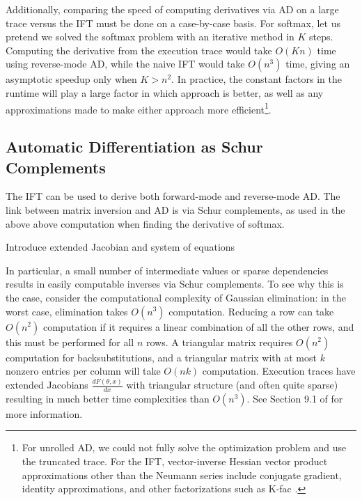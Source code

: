 \documentclass[11pt]{article}
\begin{document}
Additionally, comparing the speed of computing derivatives via AD on a large trace versus the IFT
must be done on a case-by-case basis.
For softmax, let us pretend we solved the softmax problem with an iterative method in $K$ steps.
Computing the derivative from the execution trace would take $O(Kn)$ time using reverse-mode AD,
while the naive IFT would take $O(n^3)$ time, giving an asymptotic speedup only when $K > n^2$.
In practice, the constant factors in the runtime will play a large factor in which approach
is better, as well as any approximations made to make either approach more efficient\footnote{
For unrolled AD, we could not fully solve the optimization problem and use the truncated trace.
For the IFT, vector-inverse Hessian vector product approximations other than the Neumann series
include conjugate gradient, identity approximations, and other factorizations such as K-fac
\citep{kfac}.
}.

\subsection{Automatic Differentiation as Schur Complements}
The IFT can be used to derive both forward-mode and reverse-mode AD.
The link between matrix inversion and AD is via Schur complements,
as used in the above above computation when finding the derivative of softmax.

{\color{red} Introduce extended Jacobian and system of equations}

In particular, a small number of intermediate values or sparse dependencies
results in easily computable inverses via Schur complements.
To see why this is the case, consider the computational complexity of Gaussian elimination:
in the worst case, elimination takes $O(n^3)$ computation.
Reducing a row can take $O(n^2)$ computation if it requires a linear combination of all the
other rows, and this must be performed for all $n$ rows.
A triangular matrix requires $O(n^2)$ computation for backsubstitutions,
and a triangular matrix with at most $k$ nonzero entries per column will take $O(nk)$ computation.
Execution traces have extended Jacobians $\frac{dF(\theta,x)}{dx}$
with triangular structure (and often quite sparse) resulting in much better time complexities
than $O(n^3)$.
See Section 9.1 of \citet{griewank2008autodiff} for more information.
\end{document}
